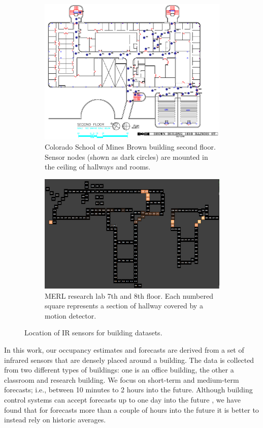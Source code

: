 \documentclass{acm_proc_article-sp}
\begin{document}
\begin{figure}[t]
\centering
\begin{subfigure}{.45\textwidth}
  \centering
  \includegraphics[width=.8\linewidth]{bb_floor2_sensors_old.png}
  \caption{Colorado School of Mines Brown building second floor.  Sensor nodes (shown as dark circles) are mounted in the ceiling of hallways and rooms.}
  \label{fig:csmbbfloor}
\end{subfigure}
\begin{subfigure}{.45\textwidth}
  \centering
  \includegraphics[width=.8\linewidth]{merl_map.png}
  \caption{MERL research lab 7th and 8th floor.  Each numbered square represents a section of hallway covered by a motion detector.}
  \label{fig:merlfloor}
\end{subfigure}
\caption{Location of IR sensors for building datasets.}
\label{fig:test}
\end{figure}

In this work, our occupancy estimates and forecasts are derived from a set of infrared sensors that are densely placed around a building.  The data is collected from two different types of buildings: one is an office building, the other a classroom and research building.  We focus on short-term and medium-term forecasts; i.e., between 10 minutes to 2 hours into the future.  Although building control systems can accept forecasts up to one day into the future \cite{Ma2010}, we have found that for forecasts more than a couple of hours into the future it is better to instead rely on historic averages.  
\end{document}

